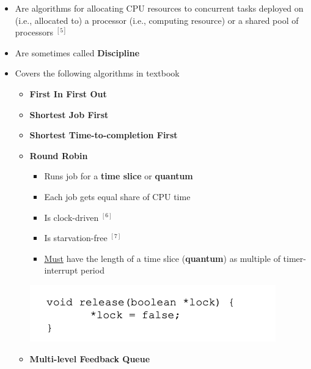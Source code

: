 \documentclass[12pt]{article}
\begin{document}
\begin{enumerate}[1.]
\begin{itemize}
        \begin{itemize}
            \item Are algorithms for allocating CPU resources to concurrent tasks
            deployed on (i.e., allocated to) a processor (i.e., computing resource)
            or a shared pool of processors $^{[5]}$
            \item Are sometimes called \textbf{Discipline}
            \item Covers the following algorithms in textbook

            \begin{itemize}
                \item \textbf{First In First Out}
                \item \textbf{Shortest Job First}
                \item \textbf{Shortest Time-to-completion First}
                \item \textbf{Round Robin}

                \begin{itemize}
                    \item Runs job for a \textbf{time slice} or \textbf{quantum}
                    \item Each job gets equal share of CPU time
                    \item Is clock-driven $^{[6]}$
                    \item Is starvation-free $^{[7]}$
                    \item \underline{Must} have the length of a time slice (\textbf{quantum}) as multiple of timer-interrupt period
                \end{itemize}

                \bigskip

                \begin{center}
                \includegraphics[width=0.7\linewidth]{images/midterm_2_solution_4.png}
                \end{center}
                \item \textbf{Multi-level Feedback Queue}
            \end{itemize}
        \end{itemize}

    \end{itemize}
\end{enumerate}
\end{document}
